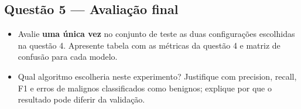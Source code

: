 \documentclass[11pt]{article}
\providecommand{\tightlist}{%
      \setlength{\itemsep}{0pt}\setlength{\parskip}{0pt}}
\begin{document}
    \subsection{Questão 5 --- Avaliação
final}\label{questuxe3o-5-avaliauxe7uxe3o-final}

\begin{itemize}
\tightlist
\item
  Avalie \textbf{uma única vez} no conjunto de teste as duas
  configurações escolhidas na questão 4. Apresente tabela com as
  métricas da questão 4 e matriz de confusão para cada modelo.
\item
  Qual algoritmo escolheria neste experimento? Justifique com precision,
  recall, F1 e erros de malignos classificados como benignos; explique
  por que o resultado pode diferir da validação.
\end{itemize}
\end{document}

